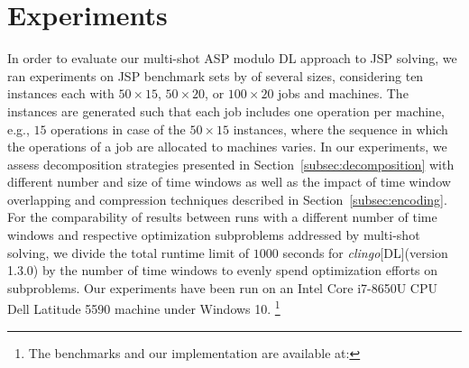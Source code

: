 \documentclass{tlp} %
\newcommand{\clingodl}{\emph{clingo}[DL]\xspace}
\begin{document}
\section{Experiments}\label{sec:experiments}
In order to evaluate our multi-shot ASP modulo DL approach to JSP solving,
we ran experiments on JSP benchmark sets by \cite{taillard1993benchmarks}
of several sizes,
considering ten instances each with
$50\times15$, $50\times20$, or $100\times20$ jobs and machines.
The instances are generated such that each job includes one operation per machine, e.g.,
$15$ operations in case of the $50\times15$ instances,
where the sequence in which the operations of a job are allocated to machines varies.
In our experiments, we assess decomposition strategies presented in Section~\ref{subsec:decomposition}
with different number and size of time windows as well as the impact of
time window overlapping and compression techniques described in Section~\ref{subsec:encoding}.
For the comparability of results between runs with a different number of time windows
and respective optimization subproblems addressed by multi-shot solving,
we divide the total runtime limit of $1000$ seconds for \clingodl (version 1.3.0) by the number
of time windows to evenly spend optimization efforts on subproblems.
Our experiments have been run on an 
Intel\textsuperscript{\textregistered} Core\texttrademark{} i7-8650U CPU %
Dell Latitude 5590 machine under Windows 10.%
\footnote{The benchmarks and our implementation are available at: \myurl}

\end{document}
